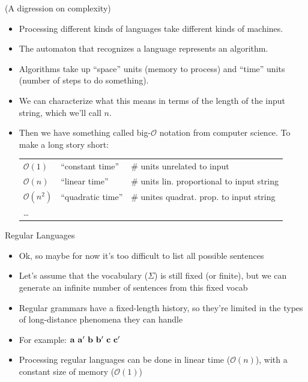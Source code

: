 \documentclass{beamer}
\newcommand{\detail}[1]{{\color{lightgrey}\small{}#1}}
\begin{document}
\begin{frame}{(A digression on complexity)}
  \begin{block}{}
    \begin{itemize}
    \item Processing different kinds of languages take different kinds of machines.\pause
    \item The automaton that recognizes a language represents an algorithm.\pause
    \item Algorithms take up ``space'' units (memory to process) and ``time'' units (number of steps to do something).\pause
    \item We can characterize what this means in terms of the length of the input string, which we'll call $n$.\pause
    \item Then we have something called big-$\mathcal{O}$ notation from computer science. To make a long story short:
      {\footnotesize \begin{tabular}{|l|l|l|}
        \hline
        $\mathcal{O}(1)$ & ``constant time'' & \# units unrelated to input\\
        $\mathcal{O}(n)$ & ``linear time'' & \# units lin. proportional to input string\\
        $\mathcal{O}(n^2)$ & ``quadratic time'' & {\# unites quadrat. \newline prop. to input string} \\
        \ldots &&\\
        \hline 
      \end{tabular} }
    \end{itemize}
  \end{block}
\end{frame}

\begin{frame}{Regular Languages}
\begin{block}{}
\begin{itemize}
	\item Ok, so maybe for now it's too difficult to list all possible sentences
	\item Let's assume that the vocabulary ($\Sigma$) is still fixed (or finite), but we can generate an infinite number of sentences from this fixed vocab
	\item Regular grammars have a fixed-length history, so they're limited in the types of long-distance phenomena they can handle
	\pause
	\item For example: $\bf a \ a^{\prime} \ b \ b^{\prime} \ c \ c^{\prime}$
	\pause
	\item Processing regular languages can be done in linear time \detail{($\mathcal{O}(n)$)}, with a constant size of memory \detail{($\mathcal{O}(1)$)}
\end{itemize}
\end{block}
\end{frame}
\end{document}
